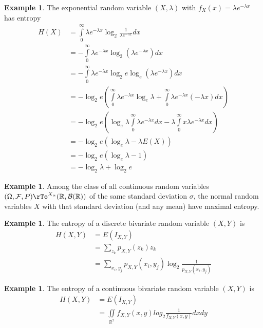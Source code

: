 \documentclass[12pt]{amsart}
\theoremstyle{definition}
\newtheorem{example}[theorem]{Example}
\begin{document}
\begin{example} The exponential random variable $(X, \lambda)$ with $f_X(x) = \lambda e^{-\lambda x}$ has entropy
\begin{align*}
H(X) & = \int\limits_0^{\infty} \lambda e^{-\lambda x} \log_2 \frac{1}{\lambda e^{-\lambda x}} dx \\
 & = -\int\limits_0^{\infty} \lambda e^{-\lambda x} \log_2(\lambda e^{-\lambda x}) dx \\
 & = -\int\limits_0^{\infty} \lambda e^{-\lambda x} \log_2 e \log_e(\lambda e^{-\lambda x}) dx \\
 & = -\log_2 e \left( \int\limits_0^{\infty} \lambda e^{-\lambda x} \log_e \lambda + \int\limits_0^{\infty} \lambda e^{-\lambda x}(-\lambda x) dx \right) \\
 & = -\log_2 e \left( \log_e \lambda \int\limits_0^{\infty} \lambda e^{- \lambda x} dx - \lambda \int\limits_0^{\infty} x \lambda e^{-\lambda x} dx \right) \\
 & = -\log_2 e \left( \log_e \lambda - \lambda E(X) \right) \\
 & = -\log_2 e (\log_e \lambda - 1) \\
 & = -\log_2 \lambda + \log_2 e
\end{align*}
\end{example}

\begin{example} Among the class of all continuous random variables $(\Omega, \mathcal{F}, P) \rTo^{X_{\alpha}} (\mathbb{R}, \mathcal{B}(\mathbb{R}))$ of the same standard deviation $\sigma$, the normal random variables $X$ with that standard deviation (and any mean) have maximal entropy.
\end{example}

\begin{example} The entropy of a discrete bivariate random variable $(X, Y)$ is
\begin{align*}
H(X, Y) & = E(I_{X, Y}) \\
 & = \sum\limits_{z_k} p_{X, Y}(z_k) z_k \\
 & = \sum\limits_{x_i, y_j} p_{X, Y}(x_i, y_j) \log_2 \frac{1}{p_{X, Y}(x_i, y_j)}
\end{align*}
\end{example}

\begin{example} The entropy of a continuous bivariate random variable $(X, Y)$ is
\begin{align*}
H(X, Y) & = E(I_{X, Y}) \\
 & = \iint\limits_{\mathbb{R}^2} f_{X, Y}(x, y) log_2 \frac{1}{f_{X, Y}(x, y)} dx dy
\end{align*}
\end{example}
\end{document}
